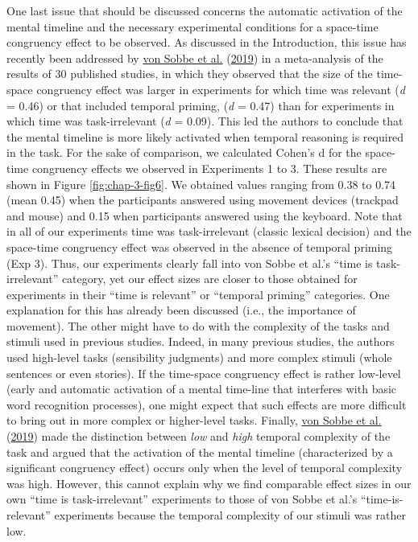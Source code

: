 \documentclass[
  a4paper,12pt,twoside,onecolumn,openright,final,oldfontcommands]{memoir}
\begin{document}
One last issue that should be discussed concerns the automatic activation of the mental timeline and the necessary experimental conditions for a space-time congruency effect to be observed. As discussed in the Introduction, this issue has recently been addressed by \protect\hyperlink{ref-von_sobbe_space-time_2019}{von Sobbe et al.} (\protect\hyperlink{ref-von_sobbe_space-time_2019}{2019}) in a meta-analysis of the results of 30 published studies, in which they observed that the size of the time-space congruency effect was larger in experiments for which time was relevant (\emph{d} = 0.46) or that included temporal priming, (\emph{d} = 0.47) than for experiments in which time was task-irrelevant (\emph{d} = 0.09). This led the authors to conclude that the mental timeline is more likely activated when temporal reasoning is required in the task. For the sake of comparison, we calculated Cohen's d for the space-time congruency effects we observed in Experiments 1 to 3. These results are shown in Figure \ref{fig:chap-3-fig6}. We obtained values ranging from 0.38 to 0.74 (mean 0.45) when the participants answered using movement devices (trackpad and mouse) and 0.15 when participants answered using the keyboard. Note that in all of our experiments time was task-irrelevant (classic lexical decision) and the space-time congruency effect was observed in the absence of temporal priming (Exp 3). Thus, our experiments clearly fall into von Sobbe et al.'s ``time is task-irrelevant'' category, yet our effect sizes are closer to those obtained for experiments in their ``time is relevant'' or ``temporal priming'' categories. One explanation for this has already been discussed (i.e., the importance of movement). The other might have to do with the complexity of the tasks and stimuli used in previous studies. Indeed, in many previous studies, the authors used high-level tasks (sensibility judgments) and more complex stimuli (whole sentences or even stories). If the time-space congruency effect is rather low-level (early and automatic activation of a mental time-line that interferes with basic word recognition processes), one might expect that such effects are more difficult to bring out in more complex or higher-level tasks. Finally, \protect\hyperlink{ref-von_sobbe_space-time_2019}{von Sobbe et al.} (\protect\hyperlink{ref-von_sobbe_space-time_2019}{2019}) made the distinction between \emph{low} and \emph{high} temporal complexity of the task and argued that the activation of the mental timeline (characterized by a significant congruency effect) occurs only when the level of temporal complexity was high. However, this cannot explain why we find comparable effect sizes in our own ``time is task-irrelevant'' experiments to those of von Sobbe et al.'s ``time-is-relevant'' experiments because the temporal complexity of our stimuli was rather low.
\end{document}
